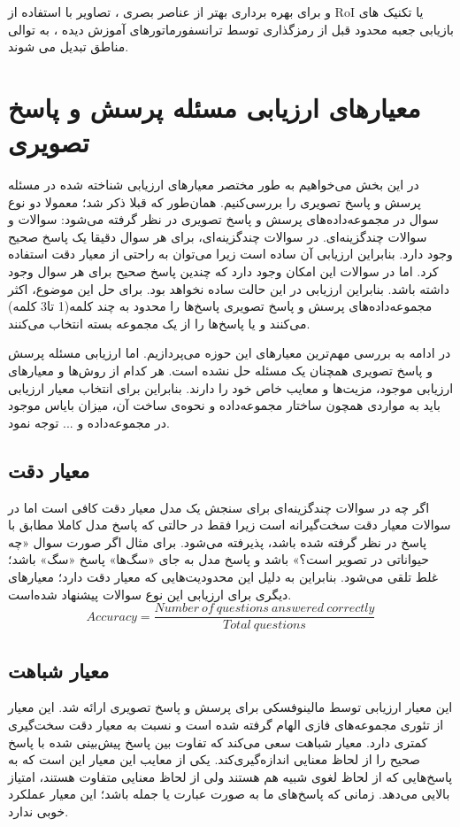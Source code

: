 و برای بهره برداری بهتر از عناصر بصری ، تصاویر با استفاده از RoI یا تکنیک های بازیابی جعبه محدود قبل از رمزگذاری توسط ترانسفورماتورهای آموزش دیده ، به توالی مناطق تبدیل می شوند.

 

\section{معیارهای ارزیابی مسئله پرسش و پاسخ تصویری}

در این بخش می‌خواهیم به طور مختصر معیارهای ارزیابی شناخته شده در مسئله پرسش و پاسخ تصویری را بررسی‌کنیم. همان‌طور که قبلا ذکر شد؛ معمولا دو نوع سوال در مجموعه‌داده‌های پرسش و پاسخ تصویری در نظر گرفته می‌شود: سوالات 
و سوالات چندگزینه‌ای. در سوالات چندگزینه‌ای، برای هر سوال دقیقا یک پاسخ صحیح وجود دارد. بنابراین ارزیابی آن ساده است زیرا می‌توان به راحتی از معیار دقت استفاده کرد. اما در سوالات
این امکان وجود دارد که چندین پاسخ صحیح برای هر سوال وجود داشته باشد. بنابراین ارزیابی در این حالت ساده نخواهد بود. برای حل این موضوع، اکثر مجموعه‌داده‌های پرسش و پاسخ تصویری پاسخ‌ها را محدود به چند کلمه(1 تا3 کلمه) می‌کنند و یا پاسخ‌ها را از یک مجموعه بسته انتخاب می‌کنند.

 در ادامه به بررسی  مهم‌ترین معیارهای این حوزه می‌پردازیم. اما ارزیابی مسئله پرسش و پاسخ تصویری همچنان یک مسئله حل نشده است. هر کدام از روش‌ها و معیارهای ارزیابی موجود، مزیت‌ها و معایب خاص خود را دارند. بنابراین برای انتخاب معیار ارزیابی باید به مواردی همچون ساختار مجموعه‌داده و نحوه‌ی ساخت آن، میزان بایاس موجود در مجموعه‌داده و ... توجه نمود. 

\subsection{معیار دقت}

		اگر چه در سوالات چندگزینه‌ای برای سنجش یک مدل معیار دقت کافی است اما در سوالات 
		معیار دقت سخت‌گیرانه است زیرا فقط در حالتی که پاسخ مدل کاملا مطابق با پاسخ در نظر گرفته شده باشد، پذیرفته می‌‌شود. برای مثال اگر صورت سوال «چه حیواناتی در تصویر است؟» باشد و پاسخ مدل به جای «سگ‌ها‌» پاسخ «سگ» باشد؛ غلط تلقی می‌شود. بنابراین به دلیل این محدودیت‌هایی که معیار دقت دارد؛ معیارهای دیگری برای ارزیابی این نوع سوالات پیشنهاد‌ شده‌است.
		\begin{equation}
		Accuracy = \frac{Number \ of \ questions \ answered \ correctly}{Total \ questions}
		\end{equation}

	
\subsection{معیار شباهت \cite{wu1994verb}}
	این معیار ارزیابی توسط مالینوفسکی 
	\cite{malinowski2014multi}
	برای پرسش و پاسخ تصویری ارائه شد. این معیار از تئوری مجموعه‌های فازی الهام گرفته شده است و نسبت به معیار دقت سخت‌گیری کمتری دارد. معیار شباهت 
	سعی می‌کند که تفاوت بین پاسخ پیش‌بینی شده با پاسخ صحیح  را از لحاظ معنایی اندازه‌گیری‌کند. یکی از معایب این معیار این است که به پاسخ‌هایی که از لحاظ لغوی شبیه هم هستند ولی از لحاظ معنایی متفاوت هستند، امتیاز بالایی می‌دهد. زمانی که پاسخ‌های ما به صورت عبارت یا جمله باشد؛ این  معیار عملکرد خوبی ندارد. 

